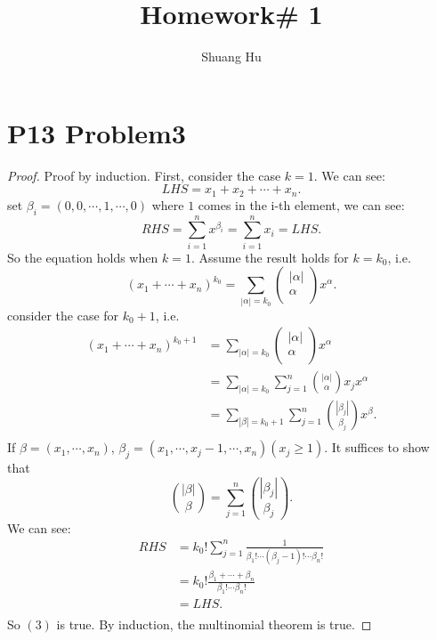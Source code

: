 \documentclass[a4paper]{ctexart}
\title{Homework\# 1}
\author{Shuang Hu}
\begin{document}
\maketitle
\section*{P13 Problem3}
\begin{proof}
Proof by induction. First, consider the case $k=1$. We can see:
$$
LHS=x_{1}+x_{2}+\cdots+x_{n}.
$$
set $\beta_{i}=(0,0,\cdots,1,\cdots,0)$ where $1$ comes in the i-th element, we can see:
$$
RHS=\sum_{i=1}^{n}x^{\beta_{i}}=\sum_{i=1}^{n}x_{i}=LHS.
$$
So the equation holds when $k=1$. Assume the result holds for $k=k_{0}$, i.e.
\begin{equation}
    (x_{1}+\cdots+x_{n})^{k_{0}}=\sum_{|\alpha|=k_{0}}\begin{pmatrix}
        |\alpha|\\
        \alpha\\
    \end{pmatrix}x^{\alpha}.
\end{equation}
consider the case for $k_{0}+1$, i.e.
\begin{equation}
    \begin{aligned}
        (x_{1}+\cdots+x_{n})^{k_{0}+1}&=\sum_{|\alpha|=k_{0}}\begin{pmatrix}
            |\alpha|\\
            \alpha\\
        \end{pmatrix}x^{\alpha}\\
        &=\sum_{|\alpha|=k_{0}}\sum_{j=1}^{n}\binom{|\alpha|}{\alpha}x_{j}x^{\alpha}\\
        &=\sum_{|\beta|=k_{0}+1}\sum_{j=1}^{n}\binom{|\beta_{j}|}{\beta_{j}}x^{\beta}.\\
    \end{aligned}
\end{equation}
If $\beta=(x_{1},\cdots,x_{n})$, $\beta_{j}=(x_{1},\cdots,x_{j}-1,\cdots,x_{n})(x_{j}\ge 1)$.
It suffices to show that
\begin{equation}
    \binom{|\beta|}{\beta}=\sum_{j=1}^{n}\binom{|\beta_{j}|}{\beta_{j}}.
\end{equation}
We can see:
\begin{equation}
    \begin{aligned}
        RHS&=k_{0}!\sum_{j=1}^{n}\frac{1}{\beta_{1}!\cdots(\beta_{j}-1)!\cdots\beta_{n}!}\\
        &=k_{0}!\frac{\beta_{1}+\cdots+\beta_{n}}{\beta_{1}!\cdots\beta_{n}!}\\
        &=LHS.\\
    \end{aligned}
\end{equation}
So $(3)$ is true. By induction, the multinomial theorem is true.
\end{proof}
\end{document}
